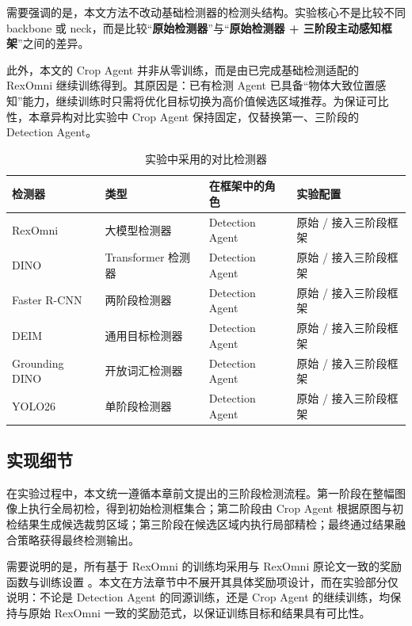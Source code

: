 需要强调的是，本文方法不改动基础检测器的检测头结构。实验核心不是比较不同 backbone 或 neck，而是比较“\textbf{原始检测器}”与“\textbf{原始检测器 + 三阶段主动感知框架}”之间的差异。

此外，本文的 Crop Agent 并非从零训练，而是由已完成基础检测适配的 RexOmni 继续训练得到。其原因是：已有检测 Agent 已具备“物体大致位置感知”能力，继续训练时只需将优化目标切换为高价值候选区域推荐。为保证可比性，本章异构对比实验中 Crop Agent 保持固定，仅替换第一、三阶段的 Detection Agent。

\begin{table}[htbp]
    \centering
    \caption{实验中采用的对比检测器}
    \label{tab:compared_detectors}
    \begin{tabular}{llll}
        \toprule
        检测器 & 类型 & 在框架中的角色 & 实验配置 \\
        \midrule
        RexOmni & 大模型检测器 & Detection Agent & 原始 / 接入三阶段框架 \\
        DINO & Transformer 检测器 & Detection Agent & 原始 / 接入三阶段框架 \\
        Faster R-CNN & 两阶段检测器 & Detection Agent & 原始 / 接入三阶段框架 \\
        DEIM & 通用目标检测器 & Detection Agent & 原始 / 接入三阶段框架 \\
        Grounding DINO & 开放词汇检测器 & Detection Agent & 原始 / 接入三阶段框架 \\
        YOLO26 & 单阶段检测器 & Detection Agent & 原始 / 接入三阶段框架 \\
        \bottomrule
    \end{tabular}
\end{table}

\subsection{实现细节}

在实验过程中，本文统一遵循本章前文提出的三阶段检测流程。第一阶段在整幅图像上执行全局初检，得到初始检测框集合；第二阶段由 Crop Agent 根据原图与初检结果生成候选裁剪区域；第三阶段在候选区域内执行局部精检；最终通过结果融合策略获得最终检测输出。

需要说明的是，所有基于 RexOmni 的训练均采用与 RexOmni 原论文一致的奖励函数与训练设置 \cite{rexomni2025}。本文在方法章节中不展开其具体奖励项设计，而在实验部分仅说明：不论是 Detection Agent 的同源训练，还是 Crop Agent 的继续训练，均保持与原始 RexOmni 一致的奖励范式，以保证训练目标和结果具有可比性。

